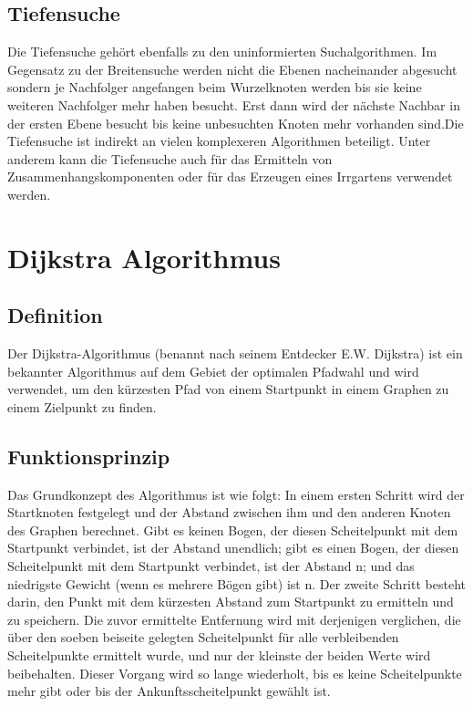 \subsection{Tiefensuche}
Die Tiefensuche gehört ebenfalls zu den uninformierten Suchalgorithmen.
Im Gegensatz zu der Breitensuche werden nicht die Ebenen nacheinander abgesucht sondern je Nachfolger angefangen 
beim Wurzelknoten werden bis sie keine weiteren Nachfolger mehr haben besucht. Erst dann wird der nächste Nachbar 
in der ersten Ebene besucht bis keine unbesuchten Knoten mehr vorhanden sind.Die Tiefensuche ist indirekt an vielen 
komplexeren Algorithmen beteiligt. Unter anderem kann die Tiefensuche auch für das Ermitteln von Zusammenhangskomponenten
oder für das Erzeugen eines Irrgartens verwendet werden.
\cite{Russell:10c}


\section{Dijkstra Algorithmus}
\label{Dijkstra Algorithmus}
\subsection{Definition}

Der Dijkstra-Algorithmus (benannt nach seinem Entdecker E.W. Dijkstra) ist ein bekannter Algorithmus auf dem Gebiet der optimalen Pfadwahl und wird verwendet, um den kürzesten Pfad von einem Startpunkt in einem Graphen zu einem Zielpunkt zu finden\cite{Javaid2019}.

\subsection{Funktionsprinzip}

Das Grundkonzept des Algorithmus ist wie folgt:
\newline
\newline
In einem ersten Schritt wird der Startknoten festgelegt und der Abstand zwischen ihm und den anderen Knoten des Graphen berechnet. Gibt es keinen Bogen, der diesen Scheitelpunkt mit dem Startpunkt verbindet, ist der Abstand unendlich; gibt es einen Bogen, der diesen Scheitelpunkt mit dem Startpunkt verbindet, ist der Abstand n; und das niedrigste Gewicht (wenn es mehrere Bögen gibt) ist n.
\newline
\newline
Der zweite Schritt besteht darin, den Punkt mit dem kürzesten Abstand zum Startpunkt zu ermitteln und zu speichern. Die zuvor ermittelte Entfernung wird mit derjenigen verglichen, die über den soeben beiseite gelegten Scheitelpunkt für alle verbleibenden Scheitelpunkte ermittelt wurde, und nur der kleinste der beiden Werte wird beibehalten. Dieser Vorgang wird so lange wiederholt, bis es keine Scheitelpunkte mehr gibt oder bis der Ankunftsscheitelpunkt gewählt ist\cite{Zhou:19}.

